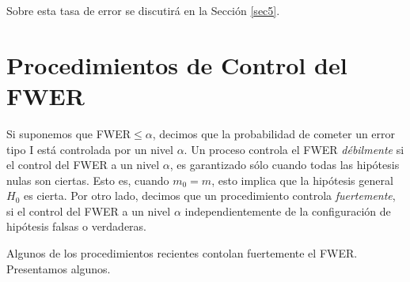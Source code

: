 \documentclass[11pt,letterpaper]{article}
\begin{document}
Sobre esta tasa de error se discutirá en la Sección \ref{sec5}.
\section{Procedimientos de Control del FWER}
Si suponemos que FWER$\leq\alpha$, decimos que 	la probabilidad de cometer un error tipo I está controlada por un nivel $\alpha$.
Un proceso controla el FWER \textit{débilmente} si el control del FWER a un nivel $\alpha$, es garantizado sólo cuando todas las hipótesis  nulas son ciertas. Esto es, cuando $m_0=m$, esto implica que la hipótesis general $H_0$ es cierta. Por otro lado, decimos que un procedimiento controla \textit{fuertemente}, si el control del FWER a un nivel $\alpha$ independientemente de la configuración de hipótesis falsas o verdaderas.

Algunos de los procedimientos recientes contolan fuertemente el FWER. Presentamos algunos.
\end{document}
